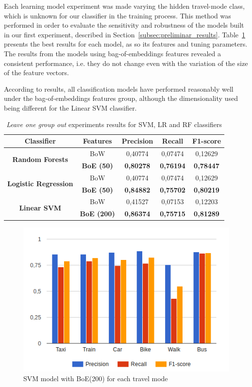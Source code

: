 Each learning model experiment was made varying the hidden travel-mode class, which is unknown for our classifier in the training process. This method was performed in order to evaluate the sensitivity and robustness of the models built in our first experiment, described in Section~\ref{subsec:preliminar_results}. Table~\ref{tab:results} presents the best results for each model, as so its features and tuning parameters. The results from the models using bag-of-embeddings features revealed a consistent performance, i.e. they do not change even with the variation of the size of the feature vectors.

According to results, all classification models have performed reasonably well under the bag-of-embeddings features group, although the dimensionality used being different for the Linear SVM classifier.

\begin{table}[htbp]
	\small
	\centering
	\caption{\emph{Leave one group out} experiments results for SVM, LR and RF classifiers}
	\label{tab:results}
	\begin{tabular}{|c|c|c|c|c|}
		\hline
		\textbf{Classifier} & \textbf{Features}  & \textbf{Precision} & \textbf{Recall}  & \textbf{F1-score} \\ \hline
		\multirow{2}{*}{\textbf{Random Forests}} & BoW & 0,40774 & 0,07474 & 0,12629  \\
		& \textbf{BoE (50)}  & \textbf{0,80278} & \textbf{0,76194} & \textbf{0,78447}  \\ \hline
		\multirow{2}{*}{\textbf{Logistic Regression}} & BoW & 0,40774 & 0,07474 & 0,12629  \\
		& \textbf{BoE (50)}  & \textbf{0,84882} & \textbf{0,75702} & \textbf{0,80219}  \\ \hline
		\multirow{2}{*}{\textbf{Linear SVM}} & BoW & 0,41527 & 0,07153 & 0,12203  \\
		& \textbf{BoE (200)} & \textbf{0,86374} & \textbf{0,75715} & \textbf{0,81289}  \\ \hline
	\end{tabular}
\end{table}

\begin{figure}[htbp]
	\centering
	\includegraphics[scale=0.7]{figures/svm_linear_leave_one_out_emb_200.png}
	\caption{SVM model with BoE(200) for each travel mode}
	\label{fig:svm_leave}
\end{figure}

